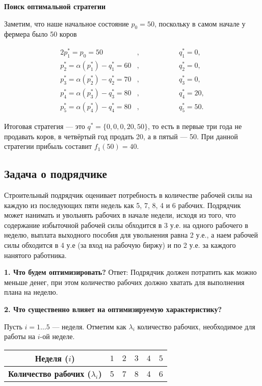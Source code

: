 \begin{enumerate}
	\bigskip
	
	\textbf{Поиск оптимальной стратегии}
	
	Заметим, что наше начальное состояние $p_0 = 50$, поскольку в самом начале у фермера было 50 коров
	
	\begin{alignat*}{2}
		p_1^* = p_0 = 50&, \qquad\qquad &&q_1^* = 0, \\
		p_2^* = \alpha(p_1^*) - q^*_1 = 60 &, &&q_2^* = 0, \\
		p_3^* = \alpha(p_2^*) - q^*_2 = 70 &, &&q_3^* = 0, \\
		p_4^* = \alpha(p_3^*) - q^*_3 = 80 &, &&q_4^* = 20, \\
		p_5^* = \alpha(p_4^*) - q^*_4 = 80 &, &&q_5^* = 50.
	\end{alignat*}
	
	Итоговая стратегия --- это $q^* = \{0, 0, 0, 20, 50\}$, то есть в первые три года не продавать коров, в четвёртый год продать 20, а в пятый --- 50. При данной стратегии прибыль составит $f_1(50) = 40$.
\end{enumerate}

\subsection{Задача о подрядчике}

Строительный подрядчик оценивает потребность в количестве рабочей силы на каждую из последующих пяти недель как 5, 7, 8, 4 и 6 рабочих. Подрядчик может нанимать и увольнять рабочих в начале недели, исходя из того, что содержание избыточной рабочей силы обходится в 3 у.е. на одного рабочего в неделю, выплата выходного пособия для увольнения равна 2 у.е., а наем рабочей силы обходится в 4 у.е (за вход на рабочую биржу) и по 2 у.е. за каждого нанятого работника.

\bigskip

\textbf{1. Что будем оптимизировать?} Ответ: Подрядчик должен потратить как можно меньше денег, при этом количество рабочих должно хватать для выполнения плана на неделю.

\bigskip

\textbf{2. Что существенно влияет на оптимизируемую характеристику?}

Пусть $i = 1 \dots 5$ --- неделя.
Отметим как $\lambda_i$ количество рабочих, необходимое для работы на $i$-ой неделе.

\begin{table}[h!]
	\centering
	\begin{tabular}{| c | c | c | c | c | c |} 
		\hline
		\textbf{Неделя ($i$)}             & $1$ & $2$ & $3$ & $4$ & $5$ \\\hline
		\textbf{Количество рабочих ($\lambda_i$)}              & 5   & 7   & 8   & 4   & 6 \\\hline
	\end{tabular}
\end{table}

